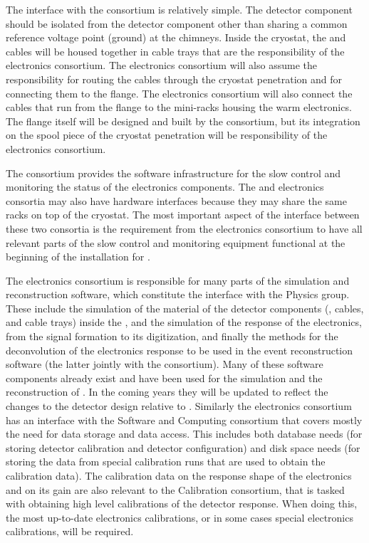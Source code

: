 The interface with the  consortium is relatively simple.
The  detector component should be isolated from the 
detector component other than sharing a common reference 
voltage point (ground) at the chimneys. Inside the cryostat, the 
 and  cables will be housed together in
cable trays that are the responsibility of the  electronics
consortium. The  electronics consortium will also assume
the responsibility for routing the  cables through the
cryostat penetration and for connecting them to the 
flange. The  electronics consortium will also connect
the cables that run from the flange
to the mini-racks housing the  warm electronics. 
The flange itself will be designed and built by the 
consortium, but its integration on the spool piece
of the cryostat penetration will be responsibility of the  electronics
consortium.

The  consortium provides the software infrastructure for the slow
control and monitoring the status of the  electronics components.
The  and  electronics consortia may also have hardware
interfaces because they may share the same racks on top of the
cryostat. The most important aspect of the interface between these
two consortia is the requirement from the  electronics consortium
to have all relevant parts of the slow control and monitoring
equipment functional at the beginning
of the installation for . 

The  electronics consortium is responsible for many parts of
the  simulation and reconstruction software, which constitute
the interface with the Physics group. These include the
simulation of the material of the detector components (, cables, and
cable trays) inside the , and the simulation
of the response of the electronics, from the signal formation to its 
digitization, and finally the methods for the deconvolution of the electronics
response to be used in the event reconstruction software (the latter jointly
with the  consortium). Many of these
software components already exist and have been used for the simulation
and the reconstruction of . In the coming years they will be
updated to reflect the changes to the detector design relative to 
. Similarly the 
electronics consortium has an interface with the Software and Computing
consortium that covers mostly the need for data storage and data access.
This includes both database needs (for storing detector calibration
and detector configuration) and disk space needs (for storing the data 
from special calibration runs that are used to obtain the calibration
data). The calibration data on the response shape of the electronics and
on its gain are also relevant to the Calibration consortium,
that is tasked with obtaining high level calibrations of the detector
response. When doing this, the most up-to-date electronics calibrations,
or in some cases special electronics calibrations, will be required.
